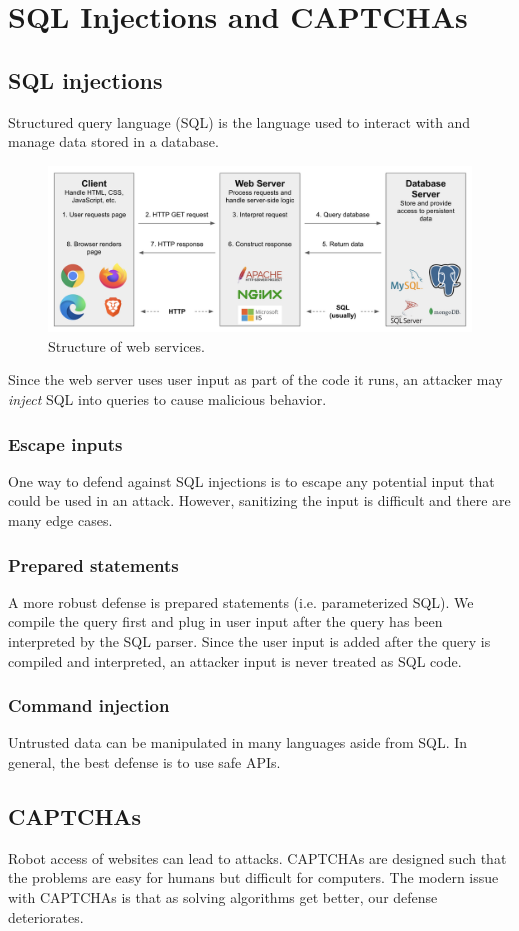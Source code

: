 \chapter{SQL Injections and CAPTCHAs}

\section{SQL injections}
Structured query language (SQL) is the language used to interact with and manage data stored in a database.

\begin{figure}[H]
  \centering
  \includegraphics[width=1\linewidth]{img/lec16-img0}
  \caption{Structure of web services.}
\end{figure}

Since the web server uses user input as part of the code it runs, an attacker may \emph{inject} SQL into queries to cause malicious behavior.

\subsection{Escape inputs}
One way to defend against SQL injections is to escape any potential input that could be used in an attack. However, sanitizing the input is difficult and there are many edge cases.

\subsection{Prepared statements}
A more robust defense is prepared statements (i.e. parameterized SQL). We compile the query first and plug in user input after the query has been interpreted by the SQL parser. Since the user input is added after the query is compiled and interpreted, an attacker input is never treated as SQL code.

\subsection{Command injection}
Untrusted data can be manipulated in many languages aside from SQL. In general, the best defense is to use safe APIs.

\section{CAPTCHAs}
Robot access of websites can lead to attacks. CAPTCHAs are designed such that the problems are easy for humans but difficult for computers. The modern issue with CAPTCHAs is that as solving algorithms get better, our defense deteriorates.